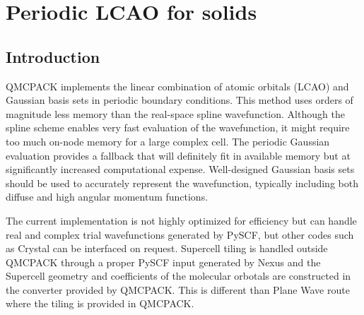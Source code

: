 \chapter{Periodic LCAO for solids}
\label{chap:LCAO}

\section{Introduction}

QMCPACK implements the linear combination of atomic orbitals (LCAO) and Gaussian
basis sets in periodic boundary conditions. This method uses orders of
magnitude less memory than the real-space spline wavefunction. Although
the spline scheme enables very fast evaluation of the wavefunction, it might
require too much on-node memory for a large complex cell. The periodic
Gaussian evaluation provides a fallback that will definitely fit in
available memory but at significantly increased computational
expense. Well-designed Gaussian basis sets should be used to accurately
represent the wavefunction, typically
including both diffuse and high angular momentum functions.

The current implementation is not highly optimized for efficiency but can handle real and complex trial wavefunctions generated by PySCF\cite{Sun2018}, but other codes such as
Crystal can be interfaced on request. Supercell tiling is handled outside QMCPACK through a proper PySCF input generated by Nexus and the Supercell geometry and coefficients of the molecular orbotals are constructed in the converter provided by QMCPACK. This is different than Plane Wave route where the tiling is provided in QMCPACK.   

